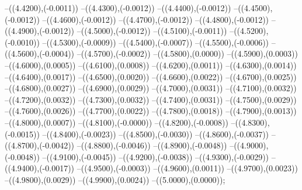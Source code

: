 {	--({\sx*(4.4200)},{\sy*(-0.0011)})
	--({\sx*(4.4300)},{\sy*(-0.0012)})
	--({\sx*(4.4400)},{\sy*(-0.0012)})
	--({\sx*(4.4500)},{\sy*(-0.0012)})
	--({\sx*(4.4600)},{\sy*(-0.0012)})
	--({\sx*(4.4700)},{\sy*(-0.0012)})
	--({\sx*(4.4800)},{\sy*(-0.0012)})
	--({\sx*(4.4900)},{\sy*(-0.0012)})
	--({\sx*(4.5000)},{\sy*(-0.0012)})
	--({\sx*(4.5100)},{\sy*(-0.0011)})
	--({\sx*(4.5200)},{\sy*(-0.0010)})
	--({\sx*(4.5300)},{\sy*(-0.0009)})
	--({\sx*(4.5400)},{\sy*(-0.0007)})
	--({\sx*(4.5500)},{\sy*(-0.0006)})
	--({\sx*(4.5600)},{\sy*(-0.0004)})
	--({\sx*(4.5700)},{\sy*(-0.0002)})
	--({\sx*(4.5800)},{\sy*(0.0000)})
	--({\sx*(4.5900)},{\sy*(0.0003)})
	--({\sx*(4.6000)},{\sy*(0.0005)})
	--({\sx*(4.6100)},{\sy*(0.0008)})
	--({\sx*(4.6200)},{\sy*(0.0011)})
	--({\sx*(4.6300)},{\sy*(0.0014)})
	--({\sx*(4.6400)},{\sy*(0.0017)})
	--({\sx*(4.6500)},{\sy*(0.0020)})
	--({\sx*(4.6600)},{\sy*(0.0022)})
	--({\sx*(4.6700)},{\sy*(0.0025)})
	--({\sx*(4.6800)},{\sy*(0.0027)})
	--({\sx*(4.6900)},{\sy*(0.0029)})
	--({\sx*(4.7000)},{\sy*(0.0031)})
	--({\sx*(4.7100)},{\sy*(0.0032)})
	--({\sx*(4.7200)},{\sy*(0.0032)})
	--({\sx*(4.7300)},{\sy*(0.0032)})
	--({\sx*(4.7400)},{\sy*(0.0031)})
	--({\sx*(4.7500)},{\sy*(0.0029)})
	--({\sx*(4.7600)},{\sy*(0.0026)})
	--({\sx*(4.7700)},{\sy*(0.0022)})
	--({\sx*(4.7800)},{\sy*(0.0018)})
	--({\sx*(4.7900)},{\sy*(0.0013)})
	--({\sx*(4.8000)},{\sy*(0.0007)})
	--({\sx*(4.8100)},{\sy*(-0.0000)})
	--({\sx*(4.8200)},{\sy*(-0.0008)})
	--({\sx*(4.8300)},{\sy*(-0.0015)})
	--({\sx*(4.8400)},{\sy*(-0.0023)})
	--({\sx*(4.8500)},{\sy*(-0.0030)})
	--({\sx*(4.8600)},{\sy*(-0.0037)})
	--({\sx*(4.8700)},{\sy*(-0.0042)})
	--({\sx*(4.8800)},{\sy*(-0.0046)})
	--({\sx*(4.8900)},{\sy*(-0.0048)})
	--({\sx*(4.9000)},{\sy*(-0.0048)})
	--({\sx*(4.9100)},{\sy*(-0.0045)})
	--({\sx*(4.9200)},{\sy*(-0.0038)})
	--({\sx*(4.9300)},{\sy*(-0.0029)})
	--({\sx*(4.9400)},{\sy*(-0.0017)})
	--({\sx*(4.9500)},{\sy*(-0.0003)})
	--({\sx*(4.9600)},{\sy*(0.0011)})
	--({\sx*(4.9700)},{\sy*(0.0023)})
	--({\sx*(4.9800)},{\sy*(0.0029)})
	--({\sx*(4.9900)},{\sy*(0.0024)})
	--({\sx*(5.0000)},{\sy*(0.0000)});
}
